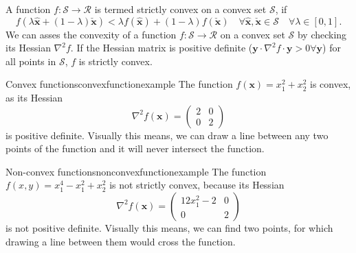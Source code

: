 A function $f: \mathcal{S} \rightarrow \mathcal{R}$ is termed strictly convex on a convex set $\mathcal{S}$, if 
\begin{equation}
    f(\lambda \hat{\mathbf{x}} + (1-\lambda) \check{\mathbf{x}}) <  \lambda f(\hat{\mathbf{x}}) + (1-\lambda) f(\check{\mathbf{x}}) \quad \forall \hat{\mathbf{x}}, \check{\mathbf{x}} \in \mathcal{S} \quad  \forall \lambda \in [0,1].
\end{equation}
We can asses the convexity of a function $f: \mathcal{S} \rightarrow \mathcal{R}$ on a convex set $\mathcal{S}$ by checking its Hessian $\nabla^2 f$. If the Hessian matrix is positive definite ($\mathbf{y} \cdot \nabla^2 f \cdot  \mathbf{y} > 0 \forall \mathbf{y}$) for all points in $\mathcal{S}$,  $f$ is strictly convex.

\begin{example}{Convex functions}{convexfunctionexample}
    The function $f(\mathbf{x})=x_1^2 + x_2^2$ is convex, as its Hessian \begin{equation}
        \nabla^2f(\mathbf{x}) = 
        \begin{pmatrix}
        2 & 0 \\ 
        0       & 2         
        \end{pmatrix}
    \end{equation} 
    is positive definite. Visually this means, we can draw a line between any two points of the function and it will never intersect the function.

    
\end{example}


\begin{example}{Non-convex functions}{nonconvexfunctionexample}
    The function $f(x, y)=x_1^4-x_1^2+x_2^2$ is not strictly convex, because its Hessian 
    \begin{equation}
        \nabla^2f(\mathbf{x}) = 
        \begin{pmatrix}
        12x_1^2-2 & 0 \\ 
        0       & 2         
        \end{pmatrix}
    \end{equation} 
    is not positive definite. Visually this means, we can find two points, for which drawing a line between them would cross the function. 
    
    
\end{example}

